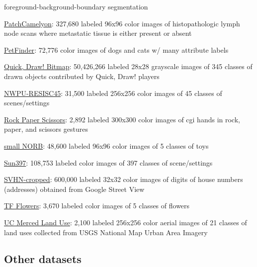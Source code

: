 \documentclass{tufte-handout}
\begin{document}
  foreground-background-boundary segmentation
\item
  \href{https://github.com/tensorflow/datasets/blob/master/docs/datasets.md\#patch_camelyon}{PatchCamelyon}:
  327,680 labeled 96x96 color images of histopathologic lymph node scans
  where metastatic tissue is either present or absent
\item
  \href{https://github.com/tensorflow/datasets/blob/master/docs/datasets.md\#pet_finder}{PetFinder}:
  72,776 color images of dogs and cats w/ many attribute labels
\item
  \href{https://github.com/tensorflow/datasets/blob/master/docs/datasets.md\#quickdraw_bitmap}{Quick,
  Draw! Bitmap}: 50,426,266 labeled 28x28 grayscale images of 345
  classes of drawn objects contributed by Quick, Draw! players
\item
  \href{https://github.com/tensorflow/datasets/blob/master/docs/datasets.md\#resisc45}{NWPU-RESISC45}:
  31,500 labeled 256x256 color images of 45 classes of scenes/settings
\item
  \href{https://github.com/tensorflow/datasets/blob/master/docs/datasets.md\#rock_paper_scissors}{Rock
  Paper Scissors}: 2,892 labeled 300x300 color images of cgi hands in
  rock, paper, and scissors gestures
\item
  \href{https://github.com/tensorflow/datasets/blob/master/docs/datasets.md\#smallnorb}{small
  NORB}: 48,600 labeled 96x96 color images of 5 classes of toys
\item
  \href{https://github.com/tensorflow/datasets/blob/master/docs/datasets.md\#sun397}{Sun397}:
  108,753 labeled color images of 397 classes of scene/settings
\item
  \href{https://github.com/tensorflow/datasets/blob/master/docs/datasets.md\#svhn_cropped}{SVHN-cropped}:
  600,000 labeled 32x32 color images of digits of house numbers
  (addresses) obtained from Google Street View
\item
  \href{https://github.com/tensorflow/datasets/blob/master/docs/datasets.md\#tf_flowers}{TF
  Flowers}: 3,670 labeled color images of 5 classes of flowers
\item
  \href{https://github.com/tensorflow/datasets/blob/master/docs/datasets.md\#uc_merced}{UC
  Merced Land Use}: 2,100 labeled 256x256 color aerial images of 21
  classes of land uses collected from USGS National Map Urban Area
  Imagery
\ei

\subsection*{Other datasets}\label{other-datasets}
\end{document}
